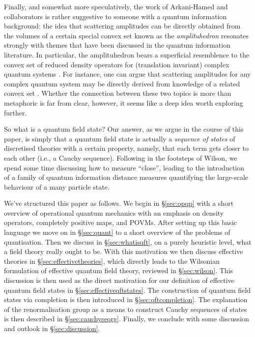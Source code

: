 \documentclass[11pt]{amsart}
\theoremstyle{plain}%
\theoremstyle{definition}
\theoremstyle{remark}
\begin{document}
Finally, and somewhat more speculatively, the work \cite{arkani-hamed_what_2010,arkani-hamed_into_2014,arkani-hamed_tree_2008,arkani-hamed_scattering_2012,arkani-hamed_all-loop_2011,arkani-hamed_amplituhedron_2014,arkani-hamed_s-matrix_2010,arkani-hamed_what_2010} of Arkani-Hamed and collaborators is rather suggestive to someone with a quantum information background: the idea that scattering amplitudes can be directly obtained from the volumes of a certain special convex set known as the \emph{amplituhedron} resonates strongly with themes that have been discussed in the quantum information literature. In particular, the amplituhedron bears a superficial resemblence to the convex set of reduced density operators for (translation invariant) complex quantum systems \cite{verstraete_matrix_2006,zauner_symmetry_2014}. For instance, one can argue that scattering amplitudes for any complex quantum system may be directly derived from knowledge of a related convex set \cite{osborne_tobiasosborne}. Whether the connection between these two topics is more than metaphoric is far from clear, however, it seems like a deep idea worth exploring further. 

So what is a quantum field state? Our answer, as we argue in the course of this paper, is simply that a quantum field state is actually a \emph{sequence of states} of discretised theories with a certain property, namely, that each term gets closer to each other (i.e., a Cauchy sequence). Following in the footsteps of Wilson, we spend some time discussing how to measure ``close'', leading to the introduction of a family of quantum information distance measures quantifying the large-scale behaviour of a many particle state. 

We've structured this paper as follows. We begin in \S\ref{sec:opqp} with a short overview of operational quantum mechanics with an emphasis on density operators, completely positive maps, and POVMs. After setting up this basic language we move on in \S\ref{sec:quant} to a short overview of the problems of quantisation. Then we discuss in \S\ref{sec:whatisqft}, on a purely heuristic level, what a field theory really ought to be. With this motivation we then discuss effective theories in \S\ref{sec:effectivetheories}, which directly leads to the Wilsonian formulation of effective quantum field theory, reviewed in \S\ref{sec:wilson}. This discussion is then used as the direct motivation for our definition of effective quantum field states in \S\ref{sec:effectiveqftstates}. The construction of quantum field states via completion is then introduced in \S\ref{sec:qftcompletion}. The explanation of the renormalisation group as a means to construct Cauchy sequences of states is then described in \S\ref{sec:cauchyseqrg}. Finally, we conclude with some discussion and outlook in \S\ref{sec:discussion}.
\end{document}
